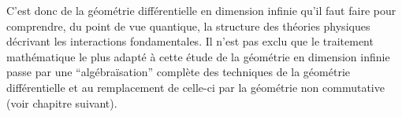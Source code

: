 C'est donc de la g\'eom\'etrie diff\'erentielle en dimension infinie qu'il faut faire
pour comprendre, du point de vue quantique, 
la structure des th\'eories physiques d\'ecrivant les interactions
fondamentales. Il n'est pas exclu que le traitement math\'ematique le plus
adapt\'e \`a cette \'etude de la g\'eom\'etrie en dimension infinie passe par une
``alg\'ebra\"isation''
compl\`ete des techniques de la g\'eom\'etrie diff\'erentielle et au remplacement de celle-ci 
par la g\'eom\'etrie non commutative (voir chapitre suivant).

